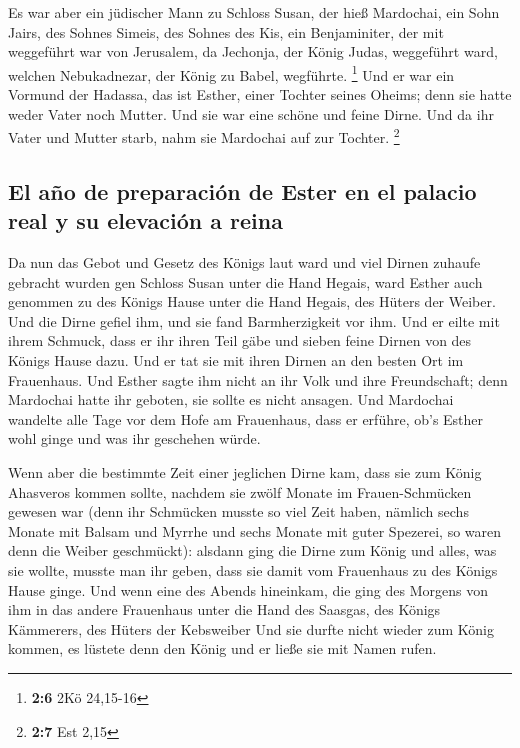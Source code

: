  Es war aber ein jüdischer Mann zu Schloss Susan, der hieß
Mardochai, ein Sohn Jairs, des Sohnes Simeis, des Sohnes des Kis, ein
Benjaminiter,  der mit weggeführt war von Jerusalem, da
Jechonja, der König Judas, weggeführt ward, welchen Nebukadnezar, der
König zu Babel, wegführte. \footnote{\textbf{2:6} 2Kö 24,15-16}
 Und er war ein Vormund der Hadassa, das ist Esther, einer
Tochter seines Oheims; denn sie hatte weder Vater noch Mutter. Und sie
war eine schöne und feine Dirne. Und da ihr Vater und Mutter starb, nahm
sie Mardochai auf zur Tochter. \footnote{\textbf{2:7} Est 2,15}

\hypertarget{el-auxf1o-de-preparaciuxf3n-de-ester-en-el-palacio-real-y-su-elevaciuxf3n-a-reina}{%
\subsection{El año de preparación de Ester en el palacio real y su
elevación a
reina}\label{el-auxf1o-de-preparaciuxf3n-de-ester-en-el-palacio-real-y-su-elevaciuxf3n-a-reina}}

 Da nun das Gebot und Gesetz des Königs laut ward und viel
Dirnen zuhaufe gebracht wurden gen Schloss Susan unter die Hand Hegais,
ward Esther auch genommen zu des Königs Hause unter die Hand Hegais, des
Hüters der Weiber.  Und die Dirne gefiel ihm, und sie fand
Barmherzigkeit vor ihm. Und er eilte mit ihrem Schmuck, dass er ihr
ihren Teil gäbe und sieben feine Dirnen von des Königs Hause dazu. Und
er tat sie mit ihren Dirnen an den besten Ort im Frauenhaus.
 Und Esther sagte ihm nicht an ihr Volk und ihre
Freundschaft; denn Mardochai hatte ihr geboten, sie sollte es nicht
ansagen.  Und Mardochai wandelte alle Tage vor dem Hofe
am Frauenhaus, dass er erführe, ob's Esther wohl ginge und was ihr
geschehen würde.

 Wenn aber die bestimmte Zeit einer jeglichen Dirne kam,
dass sie zum König Ahasveros kommen sollte, nachdem sie zwölf Monate im
Frauen-Schmücken gewesen war (denn ihr Schmücken musste so viel Zeit
haben, nämlich sechs Monate mit Balsam und Myrrhe und sechs Monate mit
guter Spezerei, so waren denn die Weiber geschmückt): 
alsdann ging die Dirne zum König und alles, was sie wollte, musste man
ihr geben, dass sie damit vom Frauenhaus zu des Königs Hause ginge.
 Und wenn eine des Abends hineinkam, die ging des Morgens
von ihm in das andere Frauenhaus unter die Hand des Saasgas, des Königs
Kämmerers, des Hüters der Kebsweiber Und sie durfte nicht wieder zum
König kommen, es lüstete denn den König und er ließe sie mit Namen
rufen.

